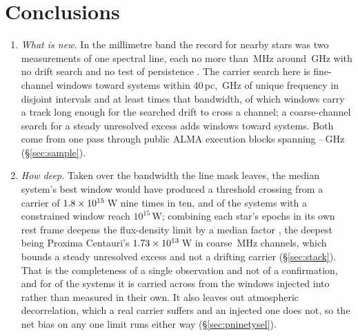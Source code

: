 \section{Conclusions}
\label{sec:conclusions}

\begin{enumerate}[leftmargin=1.6em,itemsep=4pt,topsep=4pt,parsep=0pt]

\item \emph{What is new.} In the millimetre band the record for nearby stars
was two measurements of one spectral line, each no more than
\SbPriorBandMHz\,MHz around \SbPriorFreqGHz\,GHz with no drift search and no
test of persistence \citep{Steffes1994,Mauersberger1996}. The carrier search
here is \NWinA{} fine-channel windows toward \NSysClassA{} systems within
40\,pc, \CvUnionA\,GHz of unique frequency in \CovNIslands{} disjoint intervals
and at least \SbPriorRatio{} times that bandwidth, of which \EdrNWinA{} windows
carry a track long enough for the searched drift to cross a channel; a
coarse-channel search for a steady unresolved excess adds \NWinB{} windows
toward \PrSysClassB{} systems. Both come from one pass through \NEB{} public
ALMA execution blocks spanning \SurvFreqLo--\SurvFreqHi\,GHz
(\S\ref{sec:sample}).

\item \emph{How deep.} Taken over the bandwidth the line mask leaves, the
median system's best window would have produced a threshold crossing from a
carrier of $1.8\times10^{15}$\,W nine times in ten, and \NSysEfifteen{} of
the \NSysALim{} systems with a constrained window reach $10^{15}$\,W;
combining each star's epochs in its own rest frame deepens the flux-density
limit by a median factor \SyStkGainMed, the deepest being Proxima Centauri's
$1.73\times10^{13}$\,W in coarse \ChanBModeMHz\,MHz channels, which bounds a
steady unresolved excess and not a drifting carrier (\S\ref{sec:stack}). That
is the completeness of a single observation and not of a confirmation, and for
\SmcNEstSys{} of the \NSysALim{} systems it is carried across from the
windows injected into rather than measured in their own. It also leaves out
atmospheric decorrelation, which a real carrier suffers and an injected one
does not, so the net bias on any one limit runs either way
(\S\ref{sec:pninetysel}).


\end{enumerate}
